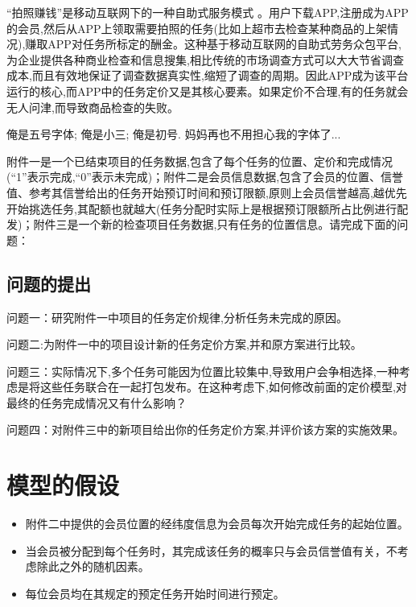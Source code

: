 \documentclass{cumcmthesis}
\begin{document}
``拍照赚钱''是移动互联网下的一种自助式服务模式 \cite{bib:one,bib:two,bib:three,bib:four}。用户下载APP,注册成为APP的会员,然后从APP上领取需要拍照的任务(比如上超市去检查某种商品的上架情况),赚取APP对任务所标定的酬金。这种基于移动互联网的自助式劳务众包平台,为企业提供各种商业检查和信息搜集,相比传统的市场调查方式可以大大节省调查成本,而且有效地保证了调查数据真实性,缩短了调查的周期。因此APP成为该平台运行的核心,而APP中的任务定价又是其核心要素。如果定价不合理,有的任务就会无人问津,而导致商品检查的失败。

{ 俺是五号字体;
  俺是小三;
  俺是初号.
妈妈再也不用担心我的字体了...}

附件一是一个已结束项目的任务数据,包含了每个任务的位置、定价和完成情况(``1''表示完成,``0''表示未完成)；附件二是会员信息数据,包含了会员的位置、信誉值、参考其信誉给出的任务开始预订时间和预订限额,原则上会员信誉越高,越优先开始挑选任务,其配额也就越大(任务分配时实际上是根据预订限额所占比例进行配发)；附件三是一个新的检查项目任务数据,只有任务的位置信息。请完成下面的问题：


\subsection{问题的提出}
问题一：研究附件一中项目的任务定价规律,分析任务未完成的原因。

问题二:为附件一中的项目设计新的任务定价方案,并和原方案进行比较。

问题三：实际情况下,多个任务可能因为位置比较集中,导致用户会争相选择,一种考虑是将这些任务联合在一起打包发布。在这种考虑下,如何修改前面的定价模型,对最终的任务完成情况又有什么影响？

问题四：对附件三中的新项目给出你的任务定价方案,并评价该方案的实施效果。

\section{模型的假设}
\begin{itemize}
\item 附件二中提供的会员位置的经纬度信息为会员每次开始完成任务的起始位置。 
\item 当会员被分配到每个任务时，其完成该任务的概率只与会员信誉值有关，不考虑除此之外的随机因素。 
\item 每位会员均在其规定的预定任务开始时间进行预定。

\end{itemize}
\end{document}
